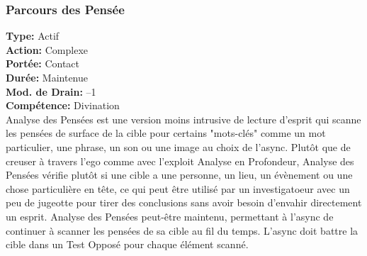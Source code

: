 \subsubsection{Parcours des Pensée} \textbf{Type:} Actif \\ \textbf{Action:} Complexe \\ \textbf{Portée:} Contact \\ \textbf{Durée:} Maintenue \\ \textbf{Mod. de Drain:} –1 \\ \textbf{Compétence:} Divination \\ Analyse des Pensées est une version moins intrusive de lecture d'esprit qui scanne les pensées de surface de la cible pour certains "mots-clés" comme un mot particulier, une phrase, un son ou une image au choix de l'async. Plutôt que de creuser à travers l'ego comme avec l'exploit Analyse en Profondeur, Analyse des Pensées vérifie plutôt si une cible a une personne, un lieu, un évènement ou une chose particulière en tête, ce qui peut être utilisé par un investigatoeur avec un peu de jugeotte pour tirer des conclusions sans avoir besoin d'envahir directement un esprit. Analyse des Pensées peut-être maintenu, permettant à l'async de continuer à scanner les pensées de sa cible au fil du temps. L'async doit battre la cible dans un Test Opposé pour chaque élément scanné. 

